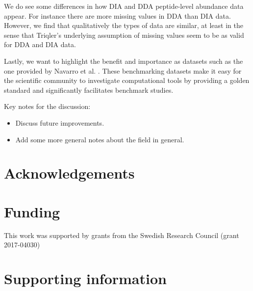 \documentclass[10pt,letterpaper]{article}
\begin{document}
We do see some differences in how DIA and DDA peptide-level abundance data appear. For instance there are more missing values in DDA than DIA data. However, we find that qualitatively the types of data are similar, at least in the sense that Triqler's underlying assumption of missing values seem to be as valid for DDA and DIA data.

Lastly, we want to highlight the benefit and importance as datasets such as the one provided by Navarro et al. \cite{navarro2016multicenter}. These benchmarking datasets make it easy for the scientific community to investigate computational tools by providing a golden standard and significantly facilitates benchmark studies. 


Key notes for the discussion:
\begin{itemize}
  \item Discuss future improvements.
  \item Add some more general notes about the field in general.
\end{itemize}


\section*{Acknowledgements}


\section*{Funding}

This work was supported by grants from the Swedish Research Council (grant 2017-04030) 

\section*{Supporting information}


%

\end{document}
